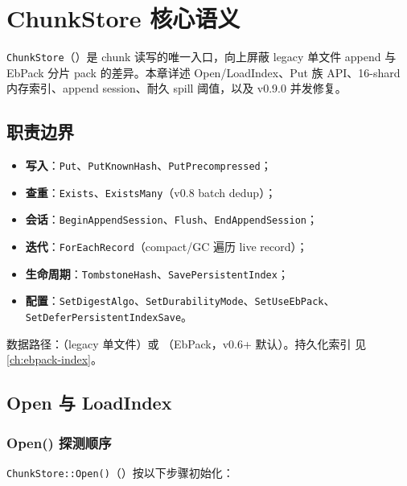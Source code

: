 \chapter{ChunkStore 核心语义}
\label{ch:chunk-store}

\texttt{ChunkStore}（）是 chunk 读写的唯一入口，向上屏蔽 legacy 单文件 append 与 EbPack 分片 pack 的差异。本章详述 Open/LoadIndex、Put 族 API、16-shard 内存索引、append session、耐久 spill 阈值，以及 v0.9.0  并发修复。

\section{职责边界}

\begin{structbox}
\begin{itemize}[nosep]
  \item \textbf{写入}：\texttt{Put}、\texttt{PutKnownHash}、\texttt{PutPrecompressed}；
  \item \textbf{查重}：\texttt{Exists}、\texttt{ExistsMany}（v0.8 batch dedup）；
  \item \textbf{会话}：\texttt{BeginAppendSession}、\texttt{Flush}、\texttt{EndAppendSession}；
  \item \textbf{迭代}：\texttt{ForEachRecord}（compact/GC 遍历 live record）；
  \item \textbf{生命周期}：\texttt{TombstoneHash}、\texttt{SavePersistentIndex}；
  \item \textbf{配置}：\texttt{SetDigestAlgo}、\texttt{SetDurabilityMode}、\texttt{SetUseEbPack}、\texttt{SetDeferPersistentIndexSave}。
\end{itemize}
\end{structbox}

数据路径：（legacy 单文件）或 （EbPack，v0.6+ 默认）。持久化索引  见 \cref{ch:ebpack-index}。

\section{Open 与 LoadIndex}

\subsection{Open() 探测顺序}

\texttt{ChunkStore::Open()}（）按以下步骤初始化：

